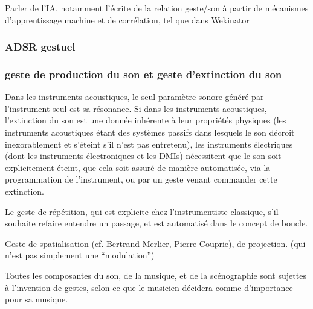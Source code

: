 
Parler de l'IA, notamment l'écrite de la relation geste/son à partir de mécanismes d'apprentissage machine et de corrélation, tel que dans Wekinator

\subsubsection{ADSR gestuel}


\subsubsection{geste de production du son et geste d'extinction du son}

Dans les instruments acoustiques, le seul paramètre sonore généré par l'instrument seul est sa résonance.
Si dans les instruments acoustiques, l'extinction du son est une donnée inhérente à leur propriétés physiques (les instruments acoustiques étant des systèmes passifs dans lesquels le son décroit inexorablement et s'éteint s'il n'est pas entretenu), les instruments électriques (dont les instruments électroniques et les \glspl{DMI}) nécessitent que le son soit explicitement éteint, que cela soit assuré de manière automatisée, via la programmation de l'instrument, ou par un geste venant commander cette extinction.

Le geste de répétition, qui est explicite chez l'instrumentiste classique, s'il souhaite refaire entendre un passage, et est automatisé dans le concept de boucle.

Geste de spatialisation (cf. Bertrand Merlier, Pierre Couprie), de projection. (qui n'est pas simplement une ``modulation'')

Toutes les composantes du son, de la musique, et de la scénographie sont sujettes à l'invention de gestes, selon ce que le musicien décidera comme d'importance pour sa musique.



